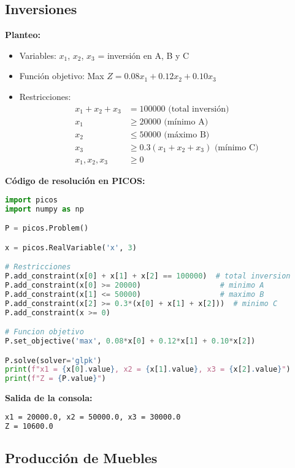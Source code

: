 \documentclass[12pt]{article}
\begin{document}
\subsection{Inversiones}

\textbf{Planteo:}
\begin{itemize}
\item Variables: $x_1$, $x_2$, $x_3$ = inversión en A, B y C
\item Función objetivo: Max $Z = 0.08x_1 + 0.12x_2 + 0.10x_3$
\item Restricciones:
  \begin{align*}
  x_1 + x_2 + x_3 &= 100000 \text{ (total inversión)} \\
  x_1 &\geq 20000 \text{ (mínimo A)} \\
  x_2 &\leq 50000 \text{ (máximo B)} \\
  x_3 &\geq 0.3(x_1 + x_2 + x_3) \text{ (mínimo C)} \\
  x_1, x_2, x_3 &\geq 0
  \end{align*}
\end{itemize}

\textbf{Código de resolución en PICOS:}
\begin{lstlisting}[language=Python]
import picos
import numpy as np

P = picos.Problem()

x = picos.RealVariable('x', 3)

# Restricciones
P.add_constraint(x[0] + x[1] + x[2] == 100000)  # total inversion
P.add_constraint(x[0] >= 20000)                  # minimo A
P.add_constraint(x[1] <= 50000)                  # maximo B
P.add_constraint(x[2] >= 0.3*(x[0] + x[1] + x[2]))  # minimo C
P.add_constraint(x >= 0)

# Funcion objetivo
P.set_objective('max', 0.08*x[0] + 0.12*x[1] + 0.10*x[2])

P.solve(solver='glpk')
print(f"x1 = {x[0].value}, x2 = {x[1].value}, x3 = {x[2].value}")
print(f"Z = {P.value}")
\end{lstlisting}

\textbf{Salida de la consola:}
\begin{lstlisting}[language=bash,backgroundcolor=\color{black},basicstyle=\color{white}\ttfamily,numbers=none]
x1 = 20000.0, x2 = 50000.0, x3 = 30000.0
Z = 10600.0
\end{lstlisting}

\subsection{Producción de Muebles}
\end{document}

